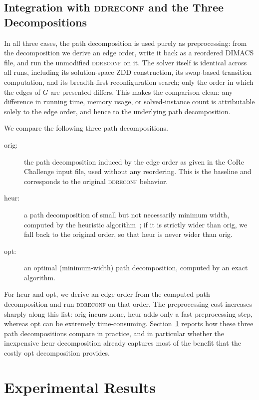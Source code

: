 \documentclass[conference]{IEEEtran}
\newcommand{\OrigDecom}{\textsf{orig}\xspace}
\newcommand{\HeurDecom}{\textsf{heur}\xspace}
\newcommand{\OptDecom}{\textsf{opt}\xspace}
\begin{document}
\subsection{Integration with \textsc{ddreconf} and the Three Decompositions}
\label{subsec:integration}

In all three cases, the path decomposition is used purely as preprocessing: from
the decomposition we derive an edge order, write it back as a reordered DIMACS
file, and run the unmodified \textsc{ddreconf} on it. The solver itself is
identical across all runs, including its solution-space ZDD construction, its
swap-based transition computation, and its breadth-first reconfiguration search;
only the order in which the edges of $G$ are presented differs. This makes the
comparison clean: any difference in running time, memory usage, or
solved-instance count is attributable solely to the edge order, and hence to the
underlying path decomposition.

We compare the following three path decompositions.
\begin{description}
  \item[\OrigDecom:] the path decomposition induced by the edge order as given in
    the CoRe Challenge input file, used without any reordering. This is the
    baseline and corresponds to the original \textsc{ddreconf} behavior.
  \item[\HeurDecom:] a path decomposition of small but not necessarily minimum
    width, computed by the heuristic algorithm~\cite{KobayashiKomuroTamaki2014};
    if it is strictly wider than \OrigDecom, we fall back to the original order,
    so that \HeurDecom is never wider than \OrigDecom.
  \item[\OptDecom:] an optimal (minimum-width) path decomposition, computed by an
    exact algorithm.
\end{description}
For \HeurDecom and \OptDecom, we derive an edge order from the computed path
decomposition and run \textsc{ddreconf} on that order. The preprocessing cost
increases sharply along this list: \OrigDecom incurs none, \HeurDecom adds only
a fast preprocessing step, whereas \OptDecom can be extremely time-consuming.
Section~\ref{sec:experiments} reports how these three path decompositions compare
in practice, and in particular whether the inexpensive \HeurDecom decomposition
already captures most of the benefit that the costly \OptDecom decomposition
provides.


\section{Experimental Results}
\label{sec:experiments}
\end{document}
